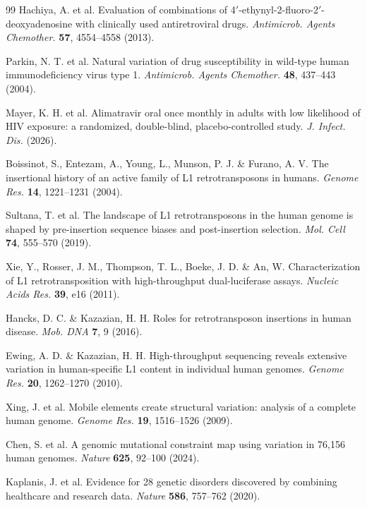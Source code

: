 \documentclass[11pt,twocolumn,twoside]{extarticle}
\begin{document}
\begin{thebibliography}{99}
 Hachiya, A. et al. Evaluation of combinations of 4$'$-ethynyl-2-fluoro-2$'$-deoxyadenosine with clinically used antiretroviral drugs. \textit{Antimicrob. Agents Chemother.} \textbf{57}, 4554--4558 (2013).

 Parkin, N. T. et al. Natural variation of drug susceptibility in wild-type human immunodeficiency virus type 1. \textit{Antimicrob. Agents Chemother.} \textbf{48}, 437--443 (2004).

 Mayer, K. H. et al. Alimatravir oral once monthly in adults with low likelihood of HIV exposure: a randomized, double-blind, placebo-controlled study. \textit{J. Infect. Dis.} (2026).

 Boissinot, S., Entezam, A., Young, L., Munson, P. J. \& Furano, A. V. The insertional history of an active family of L1 retrotransposons in humans. \textit{Genome Res.} \textbf{14}, 1221--1231 (2004).

 Sultana, T. et al. The landscape of L1 retrotransposons in the human genome is shaped by pre-insertion sequence biases and post-insertion selection. \textit{Mol. Cell} \textbf{74}, 555--570 (2019).

 Xie, Y., Rosser, J. M., Thompson, T. L., Boeke, J. D. \& An, W. Characterization of L1 retrotransposition with high-throughput dual-luciferase assays. \textit{Nucleic Acids Res.} \textbf{39}, e16 (2011).

 Hancks, D. C. \& Kazazian, H. H. Roles for retrotransposon insertions in human disease. \textit{Mob. DNA} \textbf{7}, 9 (2016).

 Ewing, A. D. \& Kazazian, H. H. High-throughput sequencing reveals extensive variation in human-specific L1 content in individual human genomes. \textit{Genome Res.} \textbf{20}, 1262--1270 (2010).

 Xing, J. et al. Mobile elements create structural variation: analysis of a complete human genome. \textit{Genome Res.} \textbf{19}, 1516--1526 (2009).

 Chen, S. et al. A genomic mutational constraint map using variation in 76,156 human genomes. \textit{Nature} \textbf{625}, 92--100 (2024).

 Kaplanis, J. et al. Evidence for 28 genetic disorders discovered by combining healthcare and research data. \textit{Nature} \textbf{586}, 757--762 (2020).

\end{thebibliography}
\end{document}
